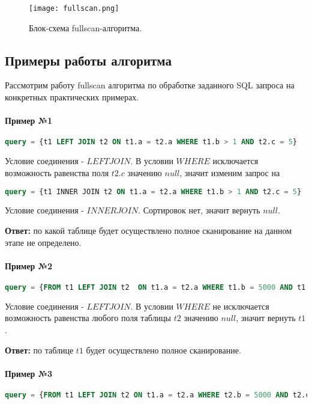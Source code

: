 \begin{figure}[h]
  \centering
  \texttt{[image: fullscan.png]}
  \caption{Блок-схема fullscan-алгоритма.}
  \label{img:fullscan}
\end{figure}


\subsection{Примеры работы алгоритма}

Рассмотрим работу fullscan алгоритма по обработке заданного SQL запроса на конкретных практических примерах.

\paragraph{Пример №1}

\begin{lstlisting}[language=SQL]
query = {t1 LEFT JOIN t2 ON t1.a = t2.a WHERE t1.b > 1 AND t2.c = 5}
\end{lstlisting}

Условие соединения - $LEFT JOIN$. В условии $WHERE$ исключается возможность равенства поля $t2.c$ значению $null$, значит изменим запрос на
\begin{lstlisting}[language=SQL]
query = {t1 INNER JOIN t2 ON t1.a = t2.a WHERE t1.b > 1 AND t2.c = 5}
\end{lstlisting}

Условие соединения - $INNER JOIN$. Сортировок нет, значит вернуть $null$. 

\textbf{Ответ:} по какой таблице будет осуществлено полное сканирование на данном этапе не определено.


\paragraph{Пример №2}
\begin{lstlisting}[language=SQL]
query = {FROM t1 LEFT JOIN t2  ON t1.a = t2.a WHERE t1.b = 5000 AND t1.c > 3 ORDER BY t2.c, t2.d}
\end{lstlisting}

Условие соединения - $LEFT JOIN$. В условии $WHERE$ не исключается возможность равенства любого поля таблицы $t2$ значению $null$, значит вернуть $t1$.

\textbf{Ответ:} по таблице $t1$ будет осуществлено полное сканирование. 


\paragraph{Пример №3}
\begin{lstlisting}[language=SQL]
query = {FROM t1 LEFT JOIN t2 ON t1.a = t2.a WHERE t2.b = 5000 AND t2.c > 3 ORDER BY t2.c, t2.d}
\end{lstlisting}

